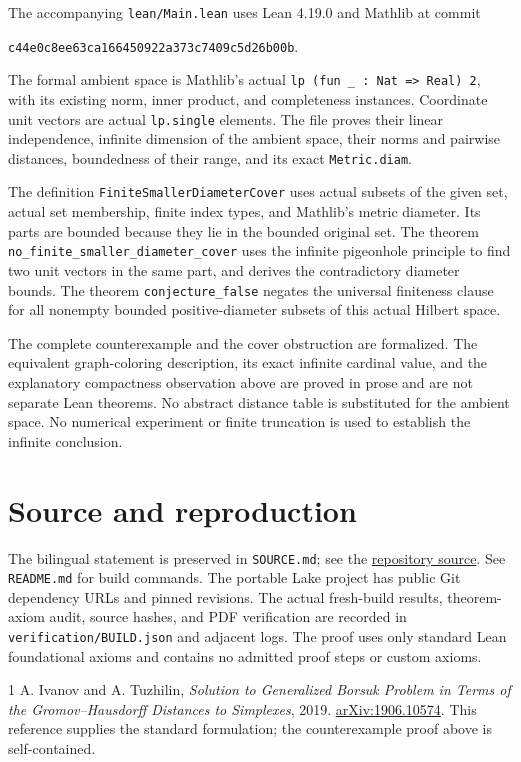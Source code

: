 \documentclass[11pt]{article}
\begin{document}
The accompanying \texttt{lean/Main.lean} uses Lean 4.19.0 and Mathlib at commit
\begin{center}\small\texttt{c44e0c8ee63ca166450922a373c7409c5d26b00b}.\end{center}
The formal ambient space is Mathlib's actual \texttt{lp (fun \_ : Nat => Real) 2}, with its existing norm, inner product, and completeness instances. Coordinate unit vectors are actual \texttt{lp.single} elements. The file proves their linear independence, infinite dimension of the ambient space, their norms and pairwise distances, boundedness of their range, and its exact \texttt{Metric.diam}.

The definition \texttt{FiniteSmallerDiameterCover} uses actual subsets of the given set, actual set membership, finite index types, and Mathlib's metric diameter. Its parts are bounded because they lie in the bounded original set. The theorem \texttt{no\_finite\_smaller\_diameter\_cover} uses the infinite pigeonhole principle to find two unit vectors in the same part, and derives the contradictory diameter bounds. The theorem \texttt{conjecture\_false} negates the universal finiteness clause for all nonempty bounded positive-diameter subsets of this actual Hilbert space.

The complete counterexample and the cover obstruction are formalized. The equivalent graph-coloring description, its exact infinite cardinal value, and the explanatory compactness observation above are proved in prose and are not separate Lean theorems. No abstract distance table is substituted for the ambient space. No numerical experiment or finite truncation is used to establish the infinite conclusion.

\section*{Source and reproduction}
The bilingual statement is preserved in \texttt{SOURCE.md}; see the
\href{https://github.com/The-Last-Math-Competition/The-Last-Math-Competition/blob/main/conjectures/00000003556.md}{repository source}.
See \texttt{README.md} for build commands. The portable Lake project has public Git dependency URLs and pinned revisions. The actual fresh-build results, theorem-axiom audit, source hashes, and PDF verification are recorded in \texttt{verification/BUILD.json} and adjacent logs. The proof uses only standard Lean foundational axioms and contains no admitted proof steps or custom axioms.

\begin{thebibliography}{1}
A. Ivanov and A. Tuzhilin,
\emph{Solution to Generalized Borsuk Problem in Terms of the Gromov--Hausdorff Distances to Simplexes},
2019. \href{https://arxiv.org/abs/1906.10574}{arXiv:1906.10574}.
This reference supplies the standard formulation; the counterexample proof above is self-contained.
\end{thebibliography}
\end{document}
